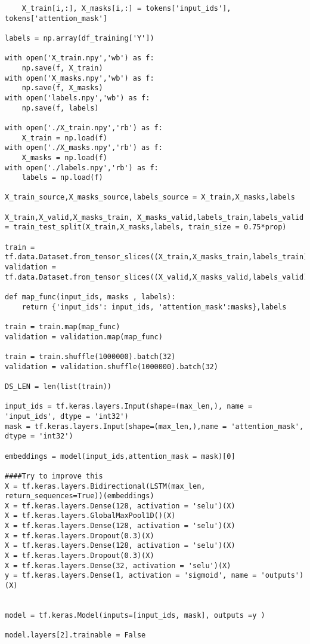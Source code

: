 \documentclass[10pt,riqno,a4paper,twoside]{article}\usepackage[]{graphicx}\usepackage[]{color}
\begin{document}
\begin{lstlisting}
    X_train[i,:], X_masks[i,:] = tokens['input_ids'], tokens['attention_mask']

labels = np.array(df_training['Y'])

with open('X_train.npy','wb') as f:
    np.save(f, X_train)
with open('X_masks.npy','wb') as f:
    np.save(f, X_masks)
with open('labels.npy','wb') as f:
    np.save(f, labels)

with open('./X_train.npy','rb') as f:
    X_train = np.load(f)
with open('./X_masks.npy','rb') as f:
    X_masks = np.load(f)
with open('./labels.npy','rb') as f:
    labels = np.load(f)

X_train_source,X_masks_source,labels_source = X_train,X_masks,labels

X_train,X_valid,X_masks_train, X_masks_valid,labels_train,labels_valid = train_test_split(X_train,X_masks,labels, train_size = 0.75*prop)

train = tf.data.Dataset.from_tensor_slices((X_train,X_masks_train,labels_train))
validation = tf.data.Dataset.from_tensor_slices((X_valid,X_masks_valid,labels_valid))

def map_func(input_ids, masks , labels):
    return {'input_ids': input_ids, 'attention_mask':masks},labels

train = train.map(map_func)
validation = validation.map(map_func)

train = train.shuffle(1000000).batch(32)
validation = validation.shuffle(1000000).batch(32)

DS_LEN = len(list(train))

input_ids = tf.keras.layers.Input(shape=(max_len,), name = 'input_ids', dtype = 'int32')
mask = tf.keras.layers.Input(shape=(max_len,),name = 'attention_mask', dtype = 'int32')

embeddings = model(input_ids,attention_mask = mask)[0]

####Try to improve this 
X = tf.keras.layers.Bidirectional(LSTM(max_len, return_sequences=True))(embeddings)
X = tf.keras.layers.Dense(128, activation = 'selu')(X)
X = tf.keras.layers.GlobalMaxPool1D()(X)
X = tf.keras.layers.Dense(128, activation = 'selu')(X)
X = tf.keras.layers.Dropout(0.3)(X)
X = tf.keras.layers.Dense(128, activation = 'selu')(X)
X = tf.keras.layers.Dropout(0.3)(X)
X = tf.keras.layers.Dense(32, activation = 'selu')(X)
y = tf.keras.layers.Dense(1, activation = 'sigmoid', name = 'outputs')(X)


model = tf.keras.Model(inputs=[input_ids, mask], outputs =y )

model.layers[2].trainable = False


\end{lstlisting}
\end{document}
